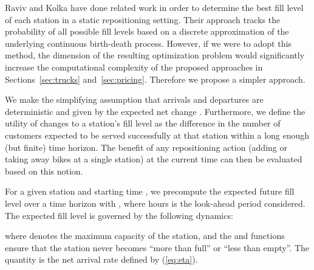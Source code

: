 \documentclass{article}
\begin{document}
Raviv and Kolka \cite{raviv_optimal_2013} have done related work in order to
determine the best fill level of each station in a static repositioning setting.
Their approach tracks the probability of all possible fill levels based on a
discrete approximation of the underlying continuous birth-death process.
However, if we were to adopt this method, the dimension of the resulting
optimization problem would significantly increase the computational complexity
of the proposed approaches in Sections~\ref{sec:trucks} and~\ref{sec:pricing}.
Therefore we propose a simpler approach.

We make the simplifying assumption that arrivals and departures are
deterministic and given by the expected net change . Furthermore, we
define the utility of changes to a station's fill level as the difference in the
number of customers expected to be served successfully at that station within a
long enough (but finite) time horizon. The benefit of any repositioning action
(adding or taking away bikes at a single station) at the current time can then
be evaluated based on this notion.

For a given station  and starting time , we precompute the expected
future fill level  over a time horizon with , where  hours is the look-ahead period considered. The
expected fill level is governed by the following dynamics:

where  denotes the maximum capacity of the station, and the 
and  functions ensure that the station never becomes ``more than full'' or
``less than empty''. The quantity  is the net arrival rate defined by
(\ref{eq:eta}).
\end{document}

